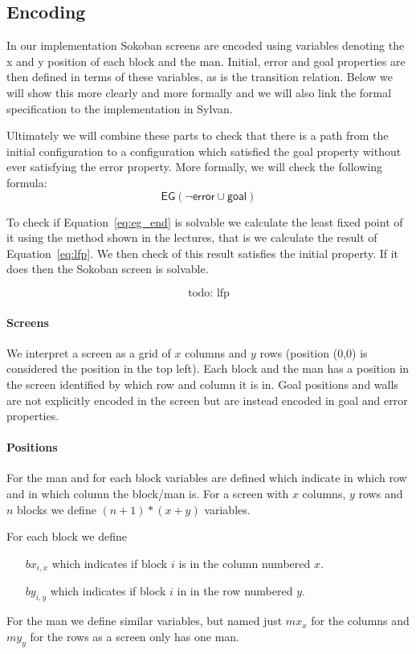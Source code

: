 \subsection{Encoding} \label{sec:encoding}
In our implementation Sokoban screens are encoded using variables denoting the
x and y position of each block and the man. Initial, error and goal properties
are then defined in terms of these variables, as is the transition relation. 
Below we will show this more 
clearly and more formally and we will also link the formal specification to the
implementation in Sylvan.

Ultimately we will combine these parts to check that there is a path from the
initial configuration to a configuration which satisfied the goal property 
without ever satisfying the error property. More formally, we will check the
following formula:
\begin{equation}\label{eq:eg_end}
	\mathsf{EG (\neg error \cup goal)}
\end{equation}

To check if Equation~\ref{eq:eg_end} is solvable we calculate the least fixed 
point of it using the method shown in the lectures, that is we
calculate the result of Equation~\ref{eq:lfp}. We then check of this result
satisfies the initial property. If it does then the Sokoban screen is solvable.

\begin{equation}\label{eq:lfp}
	\text{todo: lfp}
\end{equation}

\paragraph{Screens} We interpret a screen as a grid of $x$ columns and $y$ rows
(position (0,0) is considered the position in the top left).
Each block and the man has a position in the screen identified by which row and
column it is in. Goal positions and walls are not explicitly encoded in the 
screen but are instead encoded in goal and error properties.

\paragraph{Positions} For the man and for each block variables are defined which
indicate in which row and in which column the block/man is. For a screen with
$x$ columns, $y$ rows and $n$ blocks we define $(n+1)*(x+y)$ 
variables. 

For each block we define
\begin{itemize}
	\item[$bx_{i,x}$] which indicates if block $i$ is in the column numbered $x$.
	\item[$by_{i,y}$] which indicates if block $i$ in in the row numbered $y$.
\end{itemize}
For the man we define similar variables, but named just $mx_x$ for the columns
and $my_y$ for the rows as a screen only has one man.


